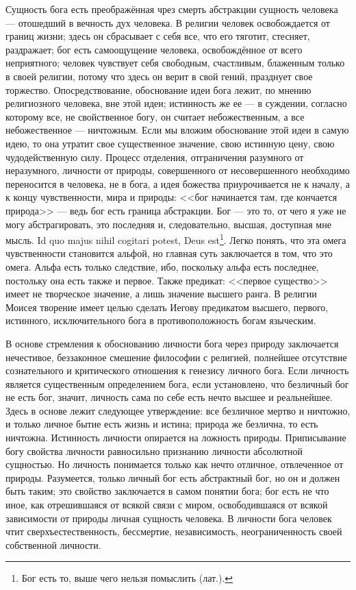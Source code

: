 \documentclass[12pt,oneside]{book}
\begin{document}
Сущность бога есть преображённая чрез смерть абстракции сущность человека --- отошедший в вечность дух человека. В религии человек освобождается от границ жизни; здесь он сбрасывает с себя все, что его тяготит, стесняет, раздражает; бог есть самоощущение человека, освобождённое от всего неприятного; человек чувствует себя свободным, счастливым, блаженным только в своей религии, потому что здесь он верит в свой гений, празднует свое торжество. Опосредствование, обоснование идеи бога лежит, по мнению религиозного человека, вне этой идеи; истинность же ее --- в суждении, согласно которому все, не свойственное богу, он считает небожественным, а все небожественное --- ничтожным. Если мы вложим обоснование этой идеи в самую идею, то она утратит свое существенное значение, свою истинную цену, свою чудодейственную силу. Процесс отделения, отграничения разумного от неразумного, личности от природы, совершенного от несовершенного необходимо переносится в человека, не в бога, а идея божества приурочивается не к началу, а к концу чувственности, мира и природы: <<бог начинается там, где кончается природа>> --- ведь бог есть граница абстракции. Бог --- это то, от чего я уже не могу абстрагировать, это последняя и, следовательно, высшая, доступная мне мысль. Id quo majus nihil cogitari potest, Deus est\footnote{Бог есть то, выше чего нельзя помыслить (лат.).}. Легко понять, что эта омега чувственности становится альфой, но главная суть заключается в том, что это омега. Альфа есть только следствие, ибо, поскольку альфа есть последнее, постольку она есть также и первое. Также предикат: <<первое существо>> имеет не творческое значение, а лишь значение высшего ранга. В религии Моисея творение имеет целью сделать Иегову предикатом высшего, первого, истинного, исключительного бога в противоположность богам языческим\ddag\let\svthefootnote\thefootnote\let\thefootnote\relax{}\let\thefootnote\svthefootnote. 

В основе стремления к обоснованию личности бога через природу заключается нечестивое, беззаконное смешение философии с религией, полнейшее отсутствие сознательного и критического отношения к генезису личного бога. Если личность является существенным определением бога, если установлено, что безличный бог не есть бог, значит, личность сама по себе есть нечто высшее и реальнейшее. Здесь в основе лежит следующее утверждение: все безличное мертво и ничтожно, и только личное бытие есть жизнь и истина; природа же безлична, то есть ничтожна. Истинность личности опирается на ложность природы. Приписывание богу свойства личности равносильно признанию личности абсолютной сущностью. Но личность понимается только как нечто отличное, отвлеченное от природы. Разумеется, только личный бог есть абстрактный бог, но он и должен быть таким; это свойство заключается в самом понятии бога; бог есть не что иное, как отрешившаяся от всякой связи с миром, освободившаяся от всякой зависимости от природы личная сущность человека. В личности бога человек чтит сверхъестественность, бессмертие, независимость, неограниченность своей собственной личности.
\end{document}
